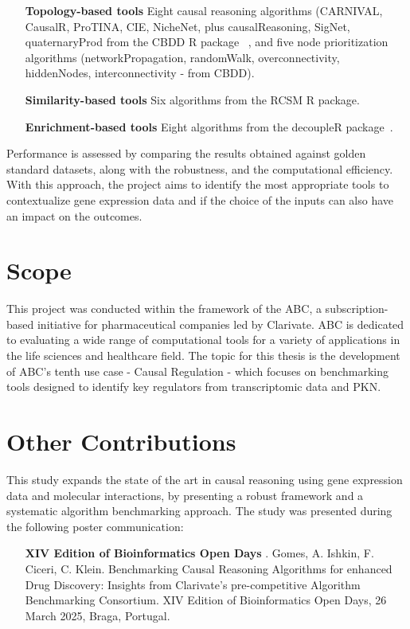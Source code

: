 \begin{enumerate}
\item[\textbf{Topology-based tools}] Eight causal reasoning algorithms (\gls{CARNIVAL}, CausalR, ProTINA, \gls{CIE}, NicheNet, plus causalReasoning, SigNet, quaternaryProd from the \gls{CBDD} \gls{R} package~\cite{RN36} , and five node prioritization algorithms (networkPropagation, randomWalk, overconnectivity, hiddenNodes, interconnectivity - from \gls{CBDD}). 
\item[\textbf{Similarity-based tools }] Six algorithms from the \gls{RCSM} R package.
\item[\textbf{Enrichment-based tools}] Eight algorithms from the decoupleR package~\cite{RN35}.
\end{enumerate}

Performance is assessed by comparing the results obtained against golden standard datasets, along with the robustness, and the computational efficiency. 
With this approach, the project aims to identify the most appropriate tools to contextualize gene expression data and if the choice of the inputs can also have an impact on the outcomes.

\section{Scope} %
\label{sec:scope}
This project was conducted within the framework of the \gls{ABC}, a subscription-based initiative for pharmaceutical companies led by Clarivate. \gls{ABC} is dedicated to evaluating a wide range of computational tools for a variety of applications in the life sciences and healthcare field. The topic for this thesis is the development of \gls{ABC}'s tenth use case - Causal Regulation - which focuses on benchmarking tools designed to identify key regulators from transcriptomic data and \gls{PKN}.

\section{Other Contributions} %
\label{sec:othercontributions}

This study expands the state of the art in causal reasoning using gene expression data and molecular interactions, by presenting a robust framework and a systematic algorithm benchmarking approach. The study was presented during the following poster communication:
\begin{enumerate}
\item[\textbf{XIV Edition of Bioinformatics Open Days}] . Gomes, A. Ishkin, F. Ciceri, C. Klein. Benchmarking Causal Reasoning Algorithms for enhanced Drug Discovery: Insights from Clarivate's pre-competitive Algorithm Benchmarking Consortium. XIV Edition of Bioinformatics Open Days, 26 March 2025, Braga, Portugal.
\end{enumerate}

